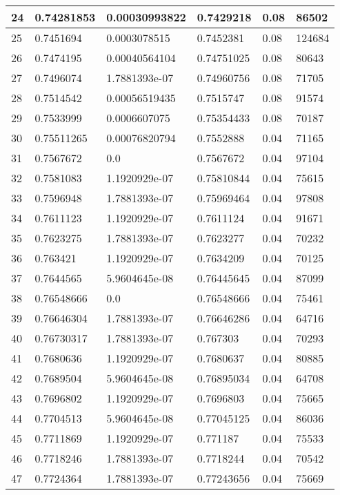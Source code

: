\begin{longtable}{|l|l|l|l|l|l|}
24 & 0.74281853 & 0.00030993822 & 0.7429218 & 0.08 & 86502 \\ \hline 
25 & 0.7451694 & 0.0003078515 & 0.7452381 & 0.08 & 124684 \\ \hline 
26 & 0.7474195 & 0.00040564104 & 0.74751025 & 0.08 & 80643 \\ \hline 
27 & 0.7496074 & 1.7881393e-07 & 0.74960756 & 0.08 & 71705 \\ \hline 
28 & 0.7514542 & 0.00056519435 & 0.7515747 & 0.08 & 91574 \\ \hline 
29 & 0.7533999 & 0.0006607075 & 0.75354433 & 0.08 & 70187 \\ \hline 
30 & 0.75511265 & 0.00076820794 & 0.7552888 & 0.04 & 71165 \\ \hline 
31 & 0.7567672 & 0.0 & 0.7567672 & 0.04 & 97104 \\ \hline 
32 & 0.7581083 & 1.1920929e-07 & 0.75810844 & 0.04 & 75615 \\ \hline 
33 & 0.7596948 & 1.7881393e-07 & 0.75969464 & 0.04 & 97808 \\ \hline 
34 & 0.7611123 & 1.1920929e-07 & 0.7611124 & 0.04 & 91671 \\ \hline 
35 & 0.7623275 & 1.7881393e-07 & 0.7623277 & 0.04 & 70232 \\ \hline 
36 & 0.763421 & 1.1920929e-07 & 0.7634209 & 0.04 & 70125 \\ \hline 
37 & 0.7644565 & 5.9604645e-08 & 0.76445645 & 0.04 & 87099 \\ \hline 
38 & 0.76548666 & 0.0 & 0.76548666 & 0.04 & 75461 \\ \hline 
39 & 0.76646304 & 1.7881393e-07 & 0.76646286 & 0.04 & 64716 \\ \hline 
40 & 0.76730317 & 1.7881393e-07 & 0.767303 & 0.04 & 70293 \\ \hline 
41 & 0.7680636 & 1.1920929e-07 & 0.7680637 & 0.04 & 80885 \\ \hline 
42 & 0.7689504 & 5.9604645e-08 & 0.76895034 & 0.04 & 64708 \\ \hline 
43 & 0.7696802 & 1.1920929e-07 & 0.7696803 & 0.04 & 75665 \\ \hline 
44 & 0.7704513 & 5.9604645e-08 & 0.77045125 & 0.04 & 86036 \\ \hline 
45 & 0.7711869 & 1.1920929e-07 & 0.771187 & 0.04 & 75533 \\ \hline 
46 & 0.7718246 & 1.7881393e-07 & 0.7718244 & 0.04 & 70542 \\ \hline 
47 & 0.7724364 & 1.7881393e-07 & 0.77243656 & 0.04 & 75669 \\ \hline 

\end{longtable}
